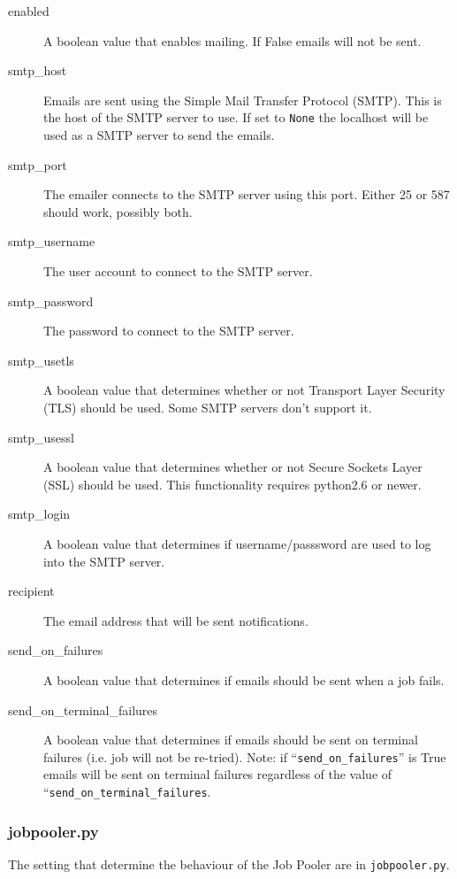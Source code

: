 \documentclass[12pt]{article}
\begin{document}
\begin{description}
    \item[enabled] A boolean value that enables mailing. If False emails will not be sent.
    \item[smtp\_host] Emails are sent using the Simple Mail Transfer Protocol (SMTP). This is the host of the SMTP server to use. If set to \texttt{None} the localhost will be used as a SMTP server to send the emails.
    \item[smtp\_port] The emailer connects to the SMTP server using this port. Either 25 or 587 should work, possibly both.
    \item[smtp\_username] The user account to connect to the SMTP server.
    \item[smtp\_password] The password to connect to the SMTP server.
    \item[smtp\_usetls] A boolean value that determines whether or not Transport Layer Security (TLS) should be used. Some SMTP servers don't support it.
    \item[smtp\_usessl] A boolean value that determines whether or not Secure Sockets Layer (SSL) should be used. This functionality requires python2.6 or newer.
    \item[smtp\_login] A boolean value that determines if username/passsword are used to log into the SMTP server.
    \item[recipient] The email address that will be sent notifications.
    \item[send\_on\_failures] A boolean value that determines if emails should be sent when a job fails.
    \item[send\_on\_terminal\_failures] A boolean value that determines if emails should be sent on terminal failures (i.e. job will not be re-tried). Note: if ``\texttt{send\_on\_failures}'' is True emails will be sent on terminal failures regardless of the value of ``\texttt{send\_on\_terminal\_failures}.
\end{description}


\subsubsection{jobpooler.py}
The setting that determine the behaviour of the Job Pooler are in \texttt{jobpooler.py}.
\end{document}
